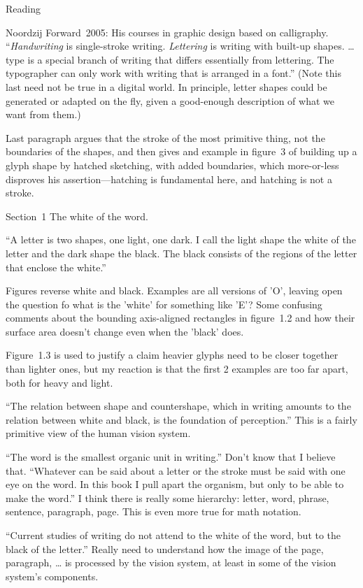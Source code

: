 \documentclass[11pt]{PalisadesLakesBook}
\begin{document}
\begin{plSection}{Reading}
\begin{plSection}{Noordzij}
Forward~2005: His courses in graphic design based on calligraphy.
``\emph{Handwriting} is single-stroke writing.
\emph{Lettering} is writing with built-up shapes.
{\ldots} type is a special branch of writing that differs 
essentially from lettering. 
The typographer can only work with writing that is arranged 
in a font.''
(Note this last need not be true in a digital world.
In principle, letter shapes could be generated or adapted
on the fly, given a good-enough description of what we want
from them.)

Last paragraph argues that the stroke of the most primitive thing,
not the boundaries of the shapes, and then gives and example
in figure~3 of building up a glyph shape by hatched sketching,
with added boundaries, which more-or-less disproves 
his assertion---hatching is fundamental here, 
and hatching is not a stroke.

Section~1 The white of the word.

``A letter is two shapes, one light, one dark. I call the light
shape the white of the letter and the dark shape the black.
The black consists of the regions of the letter that enclose
the white.''

Figures reverse white and black.
Examples are all versions of 'O',
leaving open the question fo what is the 'white' for something 
like 'E'?
Some confusing comments about the bounding axis-aligned 
rectangles in
figure~1.2 and how their surface area doesn't change
even when the 'black' does.

Figure~1.3 is used to justify a claim heavier glyphs need
to be closer together than lighter ones,
but my reaction is that the first 2 examples are too far apart,
both for heavy and light.

``The relation between shape and countershape, which in
writing amounts to the relation between white and black,
is the foundation of perception.''
This is a fairly primitive view of the human vision system.

``The word is the smallest
organic unit in writing.''
Don't know that I believe that.
``Whatever can be said about a letter
or the stroke must be said with one eye on the word. In this
book I pull apart the organism, but only to be able to make
the word.''
I think there is really some hierarchy: letter, word, phrase,
sentence, paragraph, page. 
This is even more true for math notation.

``Current studies of writing do not attend to the white of
the word, but to the black of the letter.''
Really need to understand how the image of the page, paragraph,
{\ldots} is processed by the vision system, at least in some
of the vision system's components.


\end{plSection}
\end{plSection}
\end{document}
